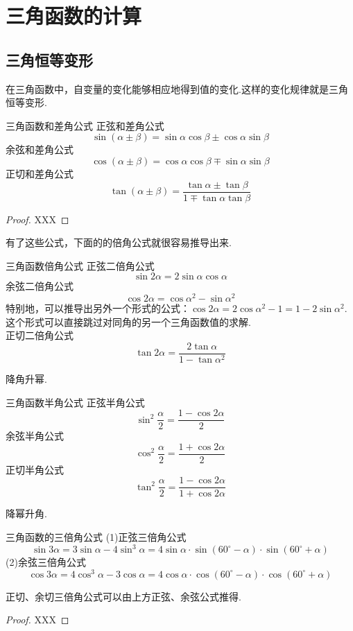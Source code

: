 \documentclass[lang=cn, zihao=5]{elegantbook}
\begin{document}
\section{三角函数的计算}

\subsection{三角恒等变形}

在三角函数中，自变量的变化能够相应地得到值的变化.这样的变化规律就是三角恒等变形.

\begin{theorem}{三角函数和差角公式} %
    正弦和差角公式$$\sin{(\alpha \pm \beta)}=\sin{\alpha}\cos{\beta} \pm \cos{\alpha}\sin{\beta}$$
    余弦和差角公式$$\cos{(\alpha \pm \beta)}=\cos{\alpha}\cos{\beta} \mp \sin{\alpha}\sin{\beta}$$
    正切和差角公式$$\tan{(\alpha \pm \beta)}=\frac{\tan{\alpha} \pm \tan{\beta}}{1 \mp \tan{\alpha}\tan{\beta}}$$
\end{theorem}
\begin{proof}
    XXX
\end{proof}

有了这些公式，下面的的倍角公式就很容易推导出来.

\begin{proposition}{三角函数倍角公式} %
    正弦二倍角公式$$\sin{2\alpha}=2\sin{\alpha}\cos{\alpha}$$
    余弦二倍角公式$$\cos{2\alpha}=\cos{\alpha ^2}-\sin{\alpha ^2}$$
    特别地，可以推导出另外一个形式的公式：$\cos{2\alpha}=2\cos{\alpha ^2}-1=1-2\sin{\alpha ^2}$.这个形式可以直接跳过对同角的另一个三角函数值的求解.\\
    正切二倍角公式$$\tan{2\alpha}=\frac{2\tan{\alpha}}{1-\tan{\alpha ^2}}$$
\end{proposition}

降角升幂.

\begin{proposition}{三角函数半角公式} %
    正弦半角公式$$\sin ^2 \frac{\alpha}{2}=\frac{1-\cos{2\alpha}}{2}$$
    余弦半角公式$$\cos ^2 \frac{\alpha}{2}=\frac{1+\cos{2\alpha}}{2}$$
    正切半角公式$$\tan ^2 \frac{\alpha}{2}=\frac{1-\cos{2\alpha}}{1+\cos{2\alpha}}$$
\end{proposition}

降幂升角.

\begin{proposition}{三角函数的三倍角公式} %
    (1)正弦三倍角公式$$\sin{3\alpha}=3\sin{\alpha}-4\sin^3 \alpha=4\sin{\alpha} \cdot \sin{(60^{\circ}-\alpha)} \cdot \sin{(60^{\circ}+\alpha)}$$
    (2)余弦三倍角公式$$\cos{3\alpha}=4\cos^3 \alpha-3\cos{\alpha}=4\cos{\alpha} \cdot \cos{(60^{\circ}-\alpha)} \cdot \cos{(60^{\circ}+\alpha)}$$
\end{proposition}
\begin{remark}
    正切、余切三倍角公式可以由上方正弦、余弦公式推得.
\end{remark}
\begin{proof}
    XXX
\end{proof}
\end{document}
